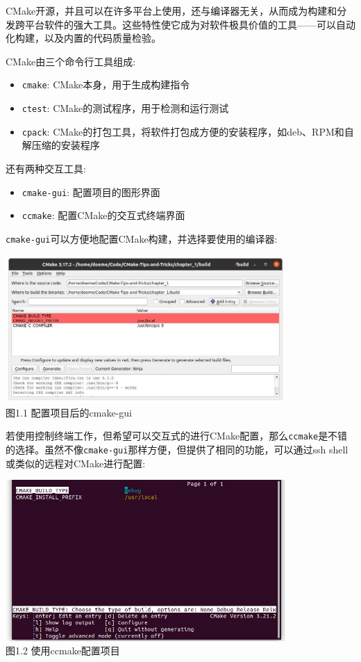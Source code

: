 CMake开源，并且可以在许多平台上使用，还与编译器无关，从而成为构建和分发跨平台软件的强大工具。这些特性使它成为对软件极具价值的工具——可以自动化构建，以及内置的代码质量检验。

CMake由三个命令行工具组成:

\begin{itemize}
\item 
\texttt{cmake}: CMake本身，用于生成构建指令

\item 
\texttt{ctest}: CMake的测试程序，用于检测和运行测试

\item 
\texttt{cpack}: CMake的打包工具，将软件打包成方便的安装程序，如deb、RPM和自解压缩的安装程序
\end{itemize}

还有两种交互工具:

\begin{itemize}
\item 
\texttt{cmake-gui}: 配置项目的图形界面

\item 
\texttt{ccmake}: 配置CMake的交互式终端界面
\end{itemize}

\texttt{cmake-gui}可以方便地配置CMake构建，并选择要使用的编译器:

\begin{center}
\includegraphics[width=0.8\textwidth]{content/1/chapter1/images/1.jpg}\\
图1.1  配置项目后的cmake-gui
\end{center}

若使用控制终端工作，但希望可以交互式的进行CMake配置，那么\texttt{ccmake}是不错的选择。虽然不像\texttt{cmake-gui}那样方便，但提供了相同的功能，可以通过ssh shell或类似的远程对CMake进行配置:

\begin{center}
\includegraphics[width=0.8\textwidth]{content/1/chapter1/images/2.jpg}\\
图1.2  使用ccmake配置项目
\end{center}

